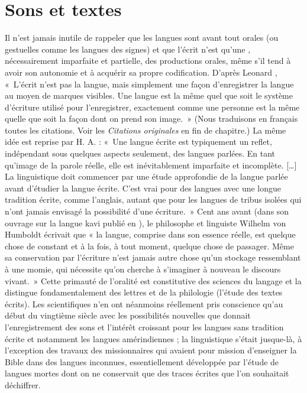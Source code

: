 \section{Sons et textes}\label{sec:1.1.2}

Il n’est jamais inutile de rappeler que les langues sont avant tout orales (ou gestuelles comme les langues des signes) et que l’écrit n’est qu’une , nécessairement imparfaite et partielle, des productions orales, même s’il tend à avoir son autonomie et à acquérir sa propre codification. D’après Leonard \citet{bloomfield1933language}, «~L’écrit n’est pas la langue, mais simplement une façon d’enregistrer la langue au moyen de marques visibles. Une langue est la même quel que soit le système d’écriture utilisé pour l’enregistrer, exactement comme une personne est la même quelle que soit la façon dont on prend son image.~» (Nous traduisons en français toutes les citations. Voir les \textit{Citations originales} en fin de chapitre.) La même idée est reprise par H. A. \citet{gleason1955introduction} : «~Une langue écrite est typiquement un reflet, indépendant sous quelques aspects seulement, des langues parlées. En tant qu’image de la parole réelle, elle est inévitablement imparfaite et incomplète. […] La linguistique doit commencer par une étude approfondie de la langue parlée avant d’étudier la langue écrite. C’est vrai pour des langues avec une longue tradition écrite, comme l’anglais, autant que pour les langues de tribus isolées qui n’ont jamais envisagé la possibilité d’une écriture.~» Cent ans avant (dans son ouvrage sur la langue kavi publié en \citeyear{humboldt1836uber}), le philosophe et linguiste Wilhelm von Humboldt écrivait que « la langue, comprise dans son essence réelle, est quelque chose de constant et à la fois, à tout moment, quelque chose de passager. Même sa conservation par l’écriture n’est jamais autre chose qu’un stockage ressemblant à une momie, qui nécessite qu’on cherche à s’imaginer à nouveau le discours vivant.~» Cette primauté de l’oralité est constitutive des sciences du langage et la distingue fondamentalement des lettres et de la philologie (l’étude des textes écrits). Les scientifiques n’en ont néanmoins réellement pris conscience qu’au début du vingtième siècle avec les possibilités nouvelles que donnait l’enregistrement des sons et l’intérêt croissant pour les langues sans tradition écrite et notamment les langues amérindiennes ; la linguistique s’était jusque-là, à l’exception des travaux des missionnaires qui avaient pour mission d’enseigner la Bible dans des langues inconnues, essentiellement développée par l’étude de langues mortes dont on ne conservait que des traces écrites que l’on souhaitait déchiffrer.

